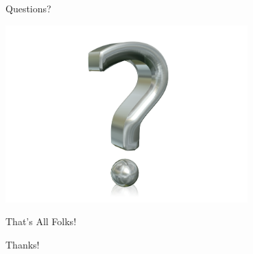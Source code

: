 \documentclass[aspectratio=169]{beamer}
\begin{document}
\begin{frame}{Questions?}
    \begin{center}
        \includegraphics[width=0.7\textwidth]{images/questions.png}
    \end{center}
\end{frame}

\begin{frame}{That's All Folks!}
    \begin{center}
        \huge{Thanks!}
    \end{center}
\end{frame}
\end{document}
